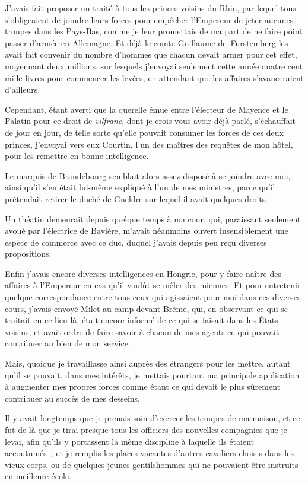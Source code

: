 \documentclass[french,twoside]{book} %
\begin{document}
J’avais fait proposer un traité à tous les princes voisins du Rhin, par lequel tous s’obligeaient de joindre leurs forces pour empêcher l’Empereur de jeter aucunes troupes dans les Pays-Bas, comme je leur promettais de ma part de ne faire point passer d’armée en Allemagne. Et déjà le comte Guillaume de Furstemberg les avait fait convenir du nombre d’hommes que chacun devait armer pour cet effet, moyennant deux millions, sur lesquels j’envoyai seulement cette année quatre cent mille livres pour commencer les levées, en attendant que les affaires s’avanceraient d’ailleurs.\par
Cependant, étant averti que la querelle émue entre l’électeur de Mayence et le Palatin pour ce droit de {\itshape vilfranc}, dont je crois vous avoir déjà parlé, s’échauffait de jour en jour, de telle sorte qu’elle pouvait consumer les forces de ces deux princes, j’envoyai vers eux Courtin, l’un des maîtres des requêtes de mon hôtel, pour les remettre en bonne intelligence.\par
Le marquis de Brandebourg semblait alors assez disposé à se joindre avec moi, ainsi qu’il s’en était lui-même expliqué à l’un de mes ministres, parce qu’il prétendait retirer le duché de Gueldre sur lequel il avait quelques droits.\par
Un théatin demeurait depuis quelque temps à ma cour, qui, paraissant seulement avoué par l’électrice de Bavière, m’avait néanmoins ouvert insensiblement une espèce de commerce avec ce duc, duquel j’avais depuis peu reçu diverses propositions.\par
Enfin j’avais encore diverses intelligences en Hongrie, pour y faire naître des affaires à l’Empereur en cas qu’il voulût se mêler des miennes. Et pour entretenir quelque correspondance entre tous ceux qui agissaient pour moi dans ces diverses cours, j’avais envoyé Milet au camp devant Brême, qui, en observant ce qui se traitait en ce lieu-là, était encore informé de ce qui se faisait dans les États voisins, et avait ordre de faire savoir à chacun de mes agents ce qui pouvait contribuer au bien de mon service.\par
Mais, quoique je travaillasse ainsi auprès des étrangers pour les mettre, autant qu’il se pouvait, dans mes intérêts, je mettais pourtant ma principale application à augmenter mes propres forces comme étant ce qui devait le plus sûrement contribuer au succès de mes desseins.\par
Il y avait longtemps que je prenais soin d’exercer les troupes de ma maison, et ce fut de là que je tirai presque tous les officiers des nouvelles compagnies que je levai, afin qu’ils y portassent la même discipline à laquelle ils étaient accoutumés ; et je remplis les places vacantes d’autres cavaliers choisis dans les vieux corps, ou de quelques jeunes gentilshommes qui ne pouvaient être instruits en meilleure école.\par
\end{document}

